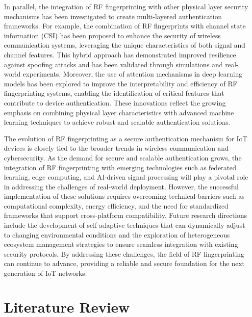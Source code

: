 \documentclass[conference]{IEEEtran}
\begin{document}
In parallel, the integration of RF fingerprinting with other physical layer security mechanisms has been investigated to create multi-layered authentication frameworks. For example, the combination of RF fingerprints with channel state information (CSI) has been proposed to enhance the security of wireless communication systems, leveraging the unique characteristics of both signal and channel features. This hybrid approach has demonstrated improved resilience against spoofing attacks and has been validated through simulations and real-world experiments. Moreover, the use of attention mechanisms in deep learning models has been explored to improve the interpretability and efficiency of RF fingerprinting systems, enabling the identification of critical features that contribute to device authentication. These innovations reflect the growing emphasis on combining physical layer characteristics with advanced machine learning techniques to achieve robust and scalable authentication solutions.  

The evolution of RF fingerprinting as a secure authentication mechanism for IoT devices is closely tied to the broader trends in wireless communication and cybersecurity. As the demand for secure and scalable authentication grows, the integration of RF fingerprinting with emerging technologies such as federated learning, edge computing, and AI-driven signal processing will play a pivotal role in addressing the challenges of real-world deployment. However, the successful implementation of these solutions requires overcoming technical barriers such as computational complexity, energy efficiency, and the need for standardized frameworks that support cross-platform compatibility. Future research directions include the development of self-adaptive techniques that can dynamically adjust to changing environmental conditions and the exploration of heterogeneous ecosystem management strategies to ensure seamless integration with existing security protocols. By addressing these challenges, the field of RF fingerprinting can continue to advance, providing a reliable and secure foundation for the next generation of IoT networks.

\section{Literature Review}
\end{document}
